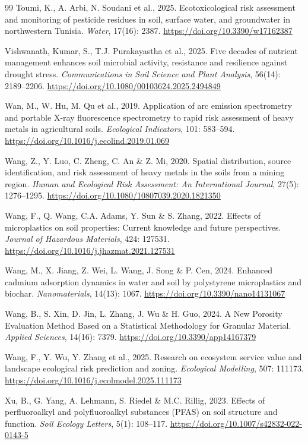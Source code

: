 \documentclass[sn-mathphys-num]{sn-jnl}
\begin{document}
\begin{thebibliography}{99}
Toumi, K., A. Arbi, N. Soudani et al., 2025.
Ecotoxicological risk assessment and monitoring of pesticide residues in soil,
surface water, and groundwater in northwestern Tunisia.
\textit{Water}, 17(16): 2387.
\url{https://doi.org/10.3390/w17162387}

Vishwanath, Kumar, S., T.J. Purakayastha et al., 2025.
Five decades of nutrient management enhances soil microbial activity,
resistance and resilience against drought stress.
\textit{Communications in Soil Science and Plant Analysis},
56(14): 2189--2206.
\url{https://doi.org/10.1080/00103624.2025.2494849}

Wan, M., W. Hu, M. Qu et al., 2019.
Application of arc emission spectrometry and portable X-ray fluorescence
spectrometry to rapid risk assessment of heavy metals in agricultural soils.
\textit{Ecological Indicators}, 101: 583--594.
\url{https://doi.org/10.1016/j.ecolind.2019.01.069}

Wang, Z., Y. Luo, C. Zheng, C. An \& Z. Mi, 2020.
Spatial distribution, source identification, and risk assessment of heavy
metals in the soils from a mining region.
\textit{Human and Ecological Risk Assessment: An International Journal},
27(5): 1276--1295.
\url{https://doi.org/10.1080/10807039.2020.1821350}

Wang, F., Q. Wang, C.A. Adams, Y. Sun \& S. Zhang, 2022.
Effects of microplastics on soil properties: Current knowledge and future
perspectives.
\textit{Journal of Hazardous Materials}, 424: 127531.
\url{https://doi.org/10.1016/j.jhazmat.2021.127531}

Wang, M., X. Jiang, Z. Wei, L. Wang, J. Song \& P. Cen, 2024.
Enhanced cadmium adsorption dynamics in water and soil by polystyrene
microplastics and biochar.
\textit{Nanomaterials}, 14(13): 1067.
\url{https://doi.org/10.3390/nano14131067}

Wang, B., S. Xin, D. Jin, L. Zhang, J. Wu \& H. Guo, 2024.
A New Porosity Evaluation Method Based on a Statistical Methodology for
Granular Material.
\textit{Applied Sciences}, 14(16): 7379.
\url{https://doi.org/10.3390/app14167379}

Wang, F., Y. Wu, Y. Zhang et al., 2025.
Research on ecosystem service value and landscape ecological risk prediction
and zoning.
\textit{Ecological Modelling}, 507: 111173.
\url{https://doi.org/10.1016/j.ecolmodel.2025.111173}

Xu, B., G. Yang, A. Lehmann, S. Riedel \& M.C. Rillig, 2023.
Effects of perfluoroalkyl and polyfluoroalkyl substances (PFAS) on soil
structure and function.
\textit{Soil Ecology Letters}, 5(1): 108--117.
\url{https://doi.org/10.1007/s42832-022-0143-5}


\end{thebibliography}
\end{document}
